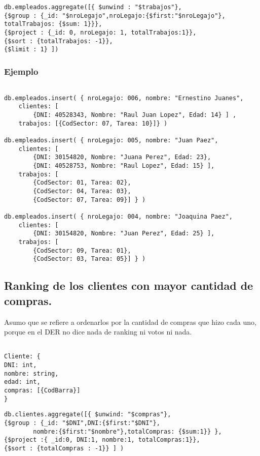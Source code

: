\begin{lstlisting}
db.empleados.aggregate([{ $unwind : "$trabajos"}, 
{$group : {_id: "$nroLegajo",nroLegajo:{$first:"$nroLegajo"}, 
totalTrabajos: {$sum: 1}}},
{$project : {_id: 0, nroLegajo: 1, totalTrabajos:1}},
{$sort : {totalTrabajos: -1}},
{$limit : 1} ])
\end{lstlisting}

\subsubsection{Ejemplo}

\begin{lstlisting}

db.empleados.insert( { nroLegajo: 006, nombre: "Ernestino Juanes", 
	clientes: [ 
		{DNI: 40528343, Nombre: "Raul Juan Lopez", Edad: 14} ] , 
	trabajos: [{CodSector: 07, Tarea: 10}]} )

db.empleados.insert( { nroLegajo: 005, nombre: "Juan Paez", 
	clientes: [ 
		{DNI: 30154820, Nombre: "Juana Perez", Edad: 23}, 
		{DNI: 40528753, Nombre: "Raul Lopez", Edad: 15} ], 
	trabajos: [
		{CodSector: 01, Tarea: 02},
		{CodSector: 04, Tarea: 03},
		{CodSector: 07, Tarea: 09}] } )

db.empleados.insert( { nroLegajo: 004, nombre: "Joaquina Paez", 
	clientes: [ 
		{DNI: 30154820, Nombre: "Juan Perez", Edad: 25} ], 
	trabajos: [
		{CodSector: 09, Tarea: 01},
		{CodSector: 03, Tarea: 05}] } )

\end{lstlisting}


\subsection{Ranking de los clientes con mayor cantidad de compras.}
Asumo que se refiere a ordenarlos por la cantidad de compras que hizo cada uno, porque en el DER no dice nada de ranking ni votos ni nada.
\begin{lstlisting}

Cliente: {
DNI: int,
nombre: string,
edad: int,
compras: [{CodBarra}]
}
\end{lstlisting}

\begin{lstlisting}
db.clientes.aggregate([{ $unwind: "$compras"}, 
{$group : {_id: "$DNI",DNI:{$first:"$DNI"},
		nombre:{$first:"$nombre"},totalCompras: {$sum:1}} }, 
{$project :{ _id:0, DNI:1, nombre:1, totalCompras:1}}, 
{$sort : {totalCompras : -1}} ] )
\end{lstlisting}
